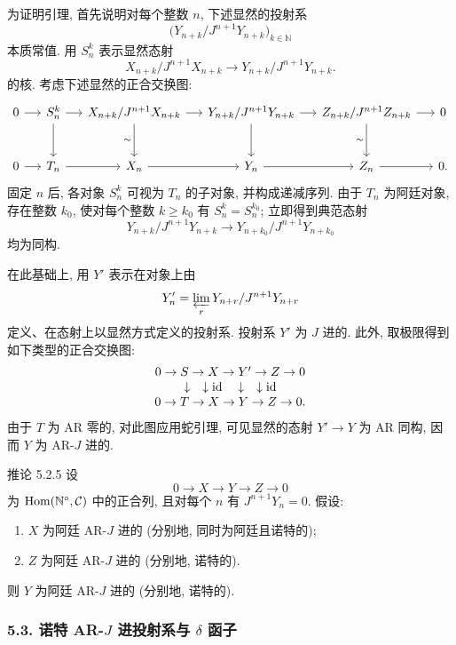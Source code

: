 \begin{prooftext}
为证明引理, 首先说明对每个整数 \(n\), 下述显然的投射系
\[
\bigl(Y_{n+k}/J^{n+1}Y_{n+k}\bigr)_{k\in\mathbb N}
\]
本质常值. 用 \(S_n^k\) 表示显然态射
\[
X_{n+k}/J^{n+1}X_{n+k}\longrightarrow
Y_{n+k}/J^{n+1}Y_{n+k}.
\]
的核. 考虑下述显然的正合交换图:
\[
\begin{tikzcd}[column sep=1.35em,row sep=large]
0 \arrow[r] & S_n^k \arrow[r] \arrow[d] & X_{n+k}/J^{n+1}X_{n+k} \arrow[r] \arrow[d,"\sim"'] & Y_{n+k}/J^{n+1}Y_{n+k} \arrow[r] \arrow[d] & Z_{n+k}/J^{n+1}Z_{n+k} \arrow[r] \arrow[d,"\sim"'] & 0\\
0 \arrow[r] & T_n \arrow[r] & X_n \arrow[r] & Y_n \arrow[r] & Z_n \arrow[r] & 0 .
\end{tikzcd}
\]
固定 \(n\) 后, 各对象 \(S_n^k\) 可视为 \(T_n\) 的子对象, 并构成递减序列. 由于 \(T_n\) 为阿廷对象, 存在整数 \(k_0\), 使对每个整数 \(k\ge k_0\) 有 \(S_n^k=S_n^{k_0}\); 立即得到典范态射
\[
Y_{n+k}/J^{n+1}Y_{n+k}
\longrightarrow
Y_{n+k_0}/J^{n+1}Y_{n+k_0}
\]
均为同构.

在此基础上, 用 \(Y'\) 表示在对象上由
\[
Y'_n=\varprojlim_r Y_{n+r}/J^{n+1}Y_{n+r}
\]
定义、在态射上以显然方式定义的投射系. 投射系 \(Y'\) 为 \(J\) 进的. 此外, 取极限得到如下类型的正合交换图:
\[
\begin{array}{ccccc}
0\to S\to X\to Y'\to Z\to0\\
\downarrow\quad\downarrow\operatorname{id}\quad\downarrow\quad\downarrow\operatorname{id}\\
0\to T\to X\to Y\to Z\to0 .
\end{array}
\]
由于 \(T\) 为 AR 零的, 对此图应用蛇引理, 可见显然的态射 \(Y'\to Y\) 为 AR 同构, 因而 \(Y\) 为 AR-\(J\) 进的.
\end{prooftext}

\begin{statement}{推论 5.2.5}
设
\[
0\longrightarrow X\longrightarrow Y\longrightarrow Z\longrightarrow0
\]
为 \(\operatorname{Hom}(\mathbb N^\circ,\mathcal C)\) 中的正合列, 且对每个 \(n\) 有 \(J^{n+1}Y_n=0\). 假设:
\begin{enumerate}[label=\textup{(\roman*)}]
\item \(X\) 为阿廷 AR-\(J\) 进的 (分别地, 同时为阿廷且诺特的);
\item \(Z\) 为阿廷 AR-\(J\) 进的 (分别地, 诺特的).
\end{enumerate}
则 \(Y\) 为阿廷 AR-\(J\) 进的 (分别地, 诺特的).
\end{statement}

\subsubsection*{5.3. 诺特 AR-\(J\) 进投射系与 \(\delta\) 函子}

